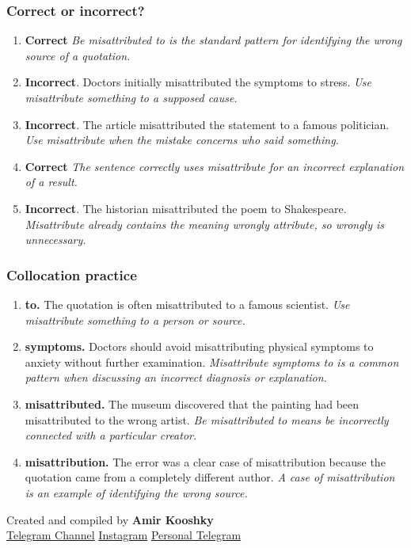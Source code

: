 \documentclass[11pt]{article}
\begin{document}
\subsubsection{Correct or incorrect?}
\begin{enumerate}
  \item \textbf{Correct} \emph{Be misattributed to is the standard pattern for identifying the wrong source of a quotation.}
  \item \textbf{Incorrect}. Doctors initially misattributed the symptoms to stress. \emph{Use misattribute something to a supposed cause.}
  \item \textbf{Incorrect}. The article misattributed the statement to a famous politician. \emph{Use misattribute when the mistake concerns who said something.}
  \item \textbf{Correct} \emph{The sentence correctly uses misattribute for an incorrect explanation of a result.}
  \item \textbf{Incorrect}. The historian misattributed the poem to Shakespeare. \emph{Misattribute already contains the meaning wrongly attribute, so wrongly is unnecessary.}
\end{enumerate}

\subsubsection{Collocation practice}
\begin{enumerate}
  \item \textbf{to.} The quotation is often misattributed to a famous scientist. \emph{Use misattribute something to a person or source.}
  \item \textbf{symptoms.} Doctors should avoid misattributing physical symptoms to anxiety without further examination. \emph{Misattribute symptoms to is a common pattern when discussing an incorrect diagnosis or explanation.}
  \item \textbf{misattributed.} The museum discovered that the painting had been misattributed to the wrong artist. \emph{Be misattributed to means be incorrectly connected with a particular creator.}
  \item \textbf{misattribution.} The error was a clear case of misattribution because the quotation came from a completely different author. \emph{A case of misattribution is an example of identifying the wrong source.}
\end{enumerate}

\vfill
\begin{center}
\small\color{Muted} Created and compiled by \textbf{Amir Kooshky}\\
\href{https://t.me/KooshkyTOEFL}{Telegram Channel}\quad\textbullet\quad
\href{https://www.instagram.com/kooshkytoefl}{Instagram}\quad\textbullet\quad
\href{https://t.me/KooshkyTOEFL\_pv}{Personal Telegram}
\end{center}
\end{document}
